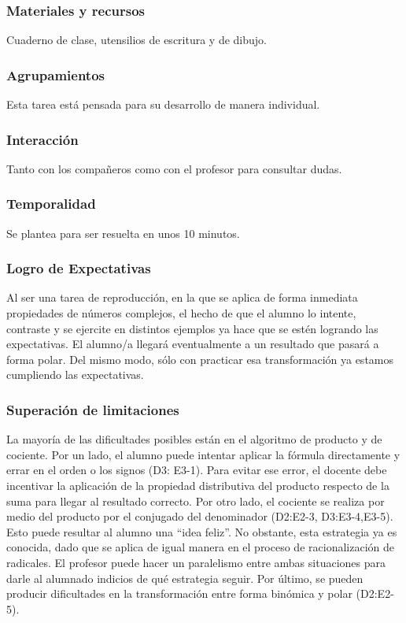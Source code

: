 \documentclass[../main.tex]{memoir}
\begin{document}
\subsubsection{Materiales y recursos}
Cuaderno de clase, utensilios de escritura y de dibujo.

\subsubsection{Agrupamientos}
Esta tarea está pensada para su desarrollo de manera individual.


\subsubsection{Interacción}
Tanto con los compañeros como con el profesor para consultar dudas.


\subsubsection{Temporalidad}
Se plantea para ser resuelta en unos 10 minutos.

\subsubsection{Logro de Expectativas}
Al ser una tarea de reproducción, en la que se aplica de forma inmediata propiedades de números complejos, el hecho de que el alumno lo intente, contraste y se ejercite en distintos ejemplos ya hace que se estén logrando las expectativas. El alumno/a llegará eventualmente a un resultado que pasará a forma polar. Del mismo modo, sólo con practicar esa transformación ya estamos cumpliendo las expectativas. 

\subsubsection{Superación de limitaciones}
La mayoría de las dificultades posibles están en el algoritmo de producto y de cociente. Por un lado, el alumno puede intentar aplicar la fórmula directamente y errar en el orden o los signos (D3: E3-1). Para evitar ese error, el docente debe incentivar la aplicación de la propiedad distributiva del producto respecto de la suma para llegar al resultado correcto. Por otro lado, el cociente se realiza por medio del producto por el conjugado del denominador (D2:E2-3, D3:E3-4,E3-5). Esto puede resultar al alumno una ``idea feliz''. No obstante, esta estrategia ya es conocida, dado que se aplica de igual manera en el proceso de racionalización de radicales. El profesor puede hacer un paralelismo entre ambas situaciones para darle al alumnado indicios de qué estrategia seguir. Por último, se pueden producir dificultades en la transformación entre forma binómica y polar (D2:E2-5).
\end{document}
